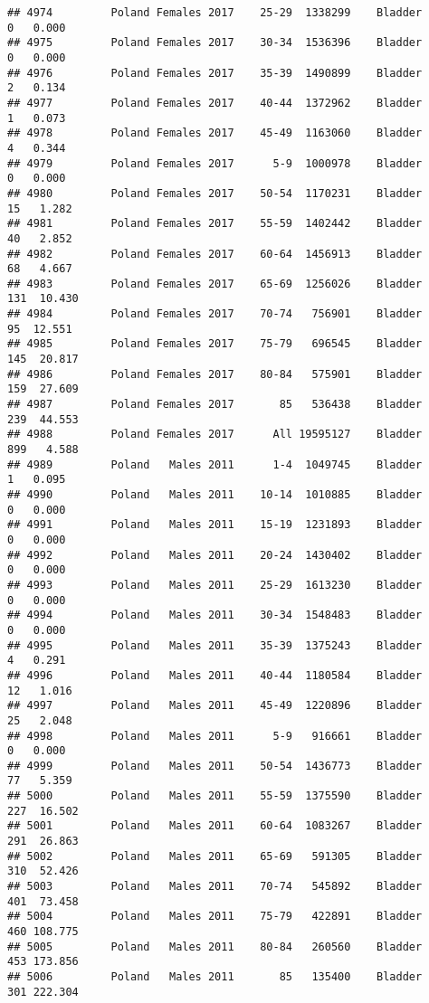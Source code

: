 \documentclass[
]{article}
\begin{document}
\begin{verbatim}
## 4974         Poland Females 2017    25-29  1338299    Bladder      0   0.000
## 4975         Poland Females 2017    30-34  1536396    Bladder      0   0.000
## 4976         Poland Females 2017    35-39  1490899    Bladder      2   0.134
## 4977         Poland Females 2017    40-44  1372962    Bladder      1   0.073
## 4978         Poland Females 2017    45-49  1163060    Bladder      4   0.344
## 4979         Poland Females 2017      5-9  1000978    Bladder      0   0.000
## 4980         Poland Females 2017    50-54  1170231    Bladder     15   1.282
## 4981         Poland Females 2017    55-59  1402442    Bladder     40   2.852
## 4982         Poland Females 2017    60-64  1456913    Bladder     68   4.667
## 4983         Poland Females 2017    65-69  1256026    Bladder    131  10.430
## 4984         Poland Females 2017    70-74   756901    Bladder     95  12.551
## 4985         Poland Females 2017    75-79   696545    Bladder    145  20.817
## 4986         Poland Females 2017    80-84   575901    Bladder    159  27.609
## 4987         Poland Females 2017       85   536438    Bladder    239  44.553
## 4988         Poland Females 2017      All 19595127    Bladder    899   4.588
## 4989         Poland   Males 2011      1-4  1049745    Bladder      1   0.095
## 4990         Poland   Males 2011    10-14  1010885    Bladder      0   0.000
## 4991         Poland   Males 2011    15-19  1231893    Bladder      0   0.000
## 4992         Poland   Males 2011    20-24  1430402    Bladder      0   0.000
## 4993         Poland   Males 2011    25-29  1613230    Bladder      0   0.000
## 4994         Poland   Males 2011    30-34  1548483    Bladder      0   0.000
## 4995         Poland   Males 2011    35-39  1375243    Bladder      4   0.291
## 4996         Poland   Males 2011    40-44  1180584    Bladder     12   1.016
## 4997         Poland   Males 2011    45-49  1220896    Bladder     25   2.048
## 4998         Poland   Males 2011      5-9   916661    Bladder      0   0.000
## 4999         Poland   Males 2011    50-54  1436773    Bladder     77   5.359
## 5000         Poland   Males 2011    55-59  1375590    Bladder    227  16.502
## 5001         Poland   Males 2011    60-64  1083267    Bladder    291  26.863
## 5002         Poland   Males 2011    65-69   591305    Bladder    310  52.426
## 5003         Poland   Males 2011    70-74   545892    Bladder    401  73.458
## 5004         Poland   Males 2011    75-79   422891    Bladder    460 108.775
## 5005         Poland   Males 2011    80-84   260560    Bladder    453 173.856
## 5006         Poland   Males 2011       85   135400    Bladder    301 222.304

\end{verbatim}
\end{document}

